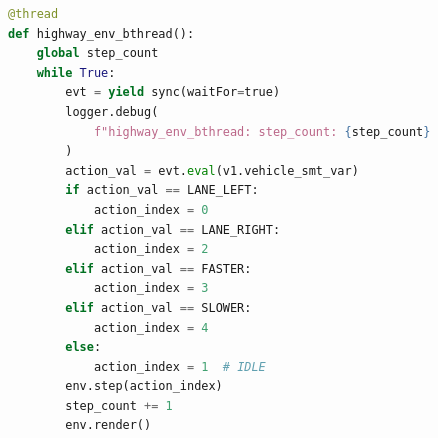 \begin{figure}[ht]
\begin{lstlisting}[language=Python, caption=Simulations-Thread Beispiel HighwayEnv, basicstyle=\ttfamily\small, label={lst:highway}]
@thread
def highway_env_bthread():
    global step_count
    while True:
        evt = yield sync(waitFor=true)
        logger.debug(
            f"highway_env_bthread: step_count: {step_count}, action: {evt.eval(v1.vehicle_smt_var)}"
        )
        action_val = evt.eval(v1.vehicle_smt_var)
        if action_val == LANE_LEFT:
            action_index = 0
        elif action_val == LANE_RIGHT:
            action_index = 2
        elif action_val == FASTER:
            action_index = 3
        elif action_val == SLOWER:
            action_index = 4
        else:
            action_index = 1  # IDLE
        env.step(action_index)
        step_count += 1
        env.render()
\end{lstlisting}
\end{figure}


